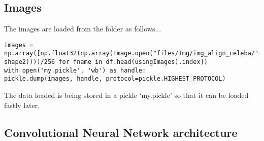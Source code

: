 \documentclass[a4paper,11pt]{article}
\begin{document}
\subsection*{Images}
The images are loaded from the folder as follows...
\begin{lstlisting}[label={list:second}]
images = np.array([np.float32(np.array(Image.open("files/Img/img_align_celeba/"+str(fname)).resize((shape1, shape2))))/256 for fname in df.head(usingImages).index])
with open('my.pickle', 'wb') as handle:
pickle.dump(images, handle, protocol=pickle.HIGHEST_PROTOCOL)
\end{lstlisting}
 The data loaded is being stored in a pickle `my.pickle' so that it can be loaded fastly later.

\subsection{Convolutional Neural Network architecture}
\end{document}
